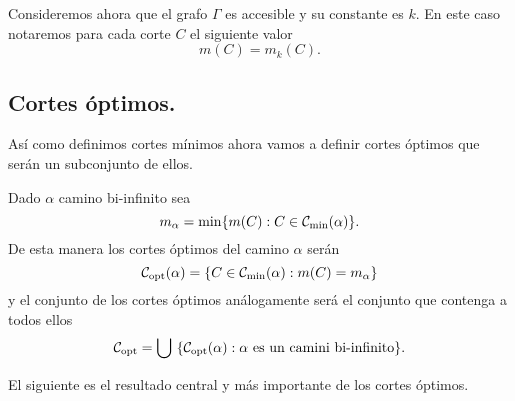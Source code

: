 \documentclass[tesis.tex]{subfiles}
\begin{document}
Consideremos ahora que el grafo $\Gamma$ es accesible y su constante es $k$.
En este caso notaremos para cada corte $C$ el siguiente valor
\[
	m(C) = m_k(C).
\]

\subsection{Cortes óptimos.}

Así como definimos cortes mínimos ahora vamos a definir cortes óptimos que serán un subconjunto de ellos.

\begin{deff}
	Dado $\alpha$ camino bi-infinito sea
	\[
		m_\alpha = \min \{ m(C) : C \in {\cal C}_{\text{min}}(\alpha) \}.
	\]
	De esta manera los cortes óptimos del camino $\alpha$ serán
	\[
		{\cal C}_{\text{opt}}(\alpha) = \{ C \in {\cal C}_{\text{min}}(\alpha) : m(C) = m_\alpha  \}
	\]
	y el conjunto de los cortes óptimos análogamente será el conjunto que contenga a todos ellos
	\[
		{\cal C}_{\text{opt}} = \bigcup \ \{ {\cal C}_{\text{opt}}(\alpha) : \alpha \ \text{es un camini bi-infinito}  \}.
	\]
\end{deff}

El siguiente es el resultado central y más importante de los cortes óptimos.
\end{document}

